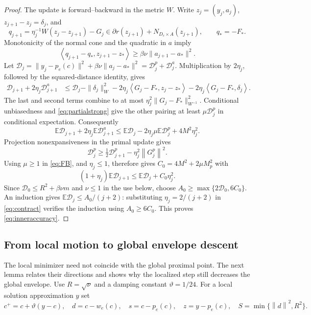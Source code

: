 \documentclass[11pt,a4paper]{article}
\newcommand{\E}{\mathbb E}
\newcommand{\norm}[1]{\left\lVert#1\right\rVert}
\newcommand{\ip}[2]{\left\langle#1,#2\right\rangle}
\theoremstyle{remark}
\numberwithin{equation}{section}
\begin{document}
\begin{proof}
The update is forward--backward in the metric $W$. Write $z_j=(y_j,a_j)$, $z_{j+1}-z_j=\delta_j$, and
\[
 q_{j+1}=\eta_j^{-1}W(z_j-z_{j+1})-G_j
 \in\partial r(z_{j+1})+N_{D_c\times A}(z_{j+1}),\qquad q_*=-F_*.
\]
Monotonicity of the normal cone and the quadratic in $a$ imply
\[
 \ip{q_{j+1}-q_*}{z_{j+1}-z_*}
 \ge \beta\nu\|a_{j+1}-a_*\|^2.
\]
Let $\mathcal D_j=\|y_j-p_e(c)\|^2+\beta\nu\|a_j-a_*\|^2=\mathcal D_j^p+\mathcal D_j^a$. Multiplication by $2\eta_j$, followed by the squared-distance identity, gives
\begin{align*}
 \mathcal D_{j+1}+2\eta_j\mathcal D^a_{j+1}
 &\le \mathcal D_j-\|\delta_j\|_W^2
 -2\eta_j\ip{G_j-F_*}{z_j-z_*}
 -2\eta_j\ip{G_j-F_*}{\delta_j}.
\end{align*}
The last and second terms combine to at most
$\eta_j^2\|G_j-F_*\|_{W^{-1}}^2$. Conditional unbiasedness and \eqref{eq:partialstrong} give the other pairing at least $\mu \mathcal D_j^p$ in conditional expectation. Consequently
\begin{equation}
 \E \mathcal D_{j+1}+2\eta_j\E \mathcal D^a_{j+1}
 \le\E \mathcal D_j-2\eta_j\mu\E \mathcal D_j^p+4M^2\eta_j^2.
 \label{eq:FB}
\end{equation}
Projection nonexpansiveness in the primal update gives
\[
 \mathcal D^p_j\ge\tfrac12\mathcal D^p_{j+1}-\eta_j^2\norm{G^p_j}^2.
\]
Using $\mu\ge1$ in \eqref{eq:FB}, and $\eta_j\le1$, therefore gives $C_0=4M^2+2\mu M_p^2$ with
\begin{equation}
 (1+\eta_j)\E \mathcal D_{j+1}\le\E \mathcal D_j+C_0\eta_j^2.
 \label{eq:contract}
\end{equation}
Since $\mathcal D_0\le R^2+\beta\nu m$ and $\nu\le1$ in the use below, choose $A_0\ge\max\{2\mathcal D_0,6C_0\}$. An induction gives $\E \mathcal D_j\le A_0/(j+2)$: substituting $\eta_j=2/(j+2)$ in \eqref{eq:contract} verifies the induction using $A_0\ge6C_0$. This proves \eqref{eq:inneraccuracy}.
\end{proof}

\subsection{From local motion to global envelope descent}
The local minimizer need not coincide with the global proximal point. The next lemma relates their directions and shows why the localized step still decreases the global envelope.
Use $R=\sqrt\nu$ and a damping constant $\vartheta=1/24$. For a local solution approximation $y$ set
\[
 c^+=c+\vartheta(y-c),\quad d=c-w_e(c),\quad s=c-p_e(c),\quad z=y-p_e(c),
 \quad S=\min\{\norm d^2,R^2\}.
\]
\end{document}
